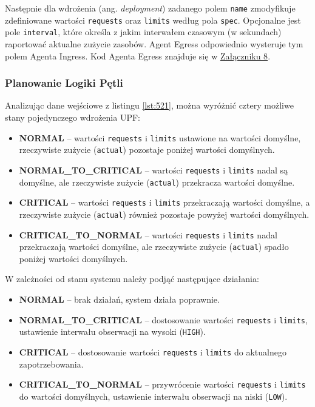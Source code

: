 Następnie dla wdrożenia (ang. \textit{deployment}) zadanego polem \texttt{name} zmodyfikuje zdefiniowane wartości \texttt{requests} oraz \texttt{limits} według pola \texttt{spec}. Opcjonalne jest pole \texttt{interval}, które określa z jakim interwałem czasowym (w sekundach) raportować aktualne zużycie zasobów. Agent Egress odpowiednio wysteruje tym polem Agenta Ingress. Kod Agenta Egress znajduje się w \hyperlink{appendix:8}{Załączniku 8}.

\subsubsection{Planowanie Logiki Pętli}

Analizując dane wejściowe z listingu \ref{lst:521}, można wyróżnić cztery możliwe stany pojedynczego wdrożenia UPF:
\begin{itemize}
    \item \textbf{NORMAL} – wartości \texttt{requests} i \texttt{limits} ustawione na wartości domyślne, rzeczywiste zużycie (\texttt{actual}) pozostaje poniżej wartości domyślnych.
    \item \textbf{NORMAL\_TO\_CRITICAL} – wartości \texttt{requests} i \texttt{limits} nadal są domyślne, ale rzeczywiste zużycie (\texttt{actual}) przekracza wartości domyślne.
    \item \textbf{CRITICAL} – wartości \texttt{requests} i \texttt{limits} przekraczają wartości domyślne, a rzeczywiste zużycie (\texttt{actual}) również pozostaje powyżej wartości domyślnych.
    \item \textbf{CRITICAL\_TO\_NORMAL} – wartości \texttt{requests} i \texttt{limits} nadal przekraczają wartości domyślne, ale rzeczywiste zużycie (\texttt{actual}) spadło poniżej wartości domyślnych.
\end{itemize}

W zależności od stanu systemu należy podjąć następujące działania:
\begin{itemize}
    \item \textbf{NORMAL} – brak działań, system działa poprawnie.
    \item \textbf{NORMAL\_TO\_CRITICAL} – dostosowanie wartości \texttt{requests} i \texttt{limits}, ustawienie interwału obserwacji na wysoki (\texttt{HIGH}).
    \item \textbf{CRITICAL} – dostosowanie wartości \texttt{requests} i \texttt{limits} do aktualnego zapotrzebowania.
    \item \textbf{CRITICAL\_TO\_NORMAL} – przywrócenie wartości \texttt{requests} i \texttt{limits} do wartości domyślnych, ustawienie interwału obserwacji na niski (\texttt{LOW}).
\end{itemize}

